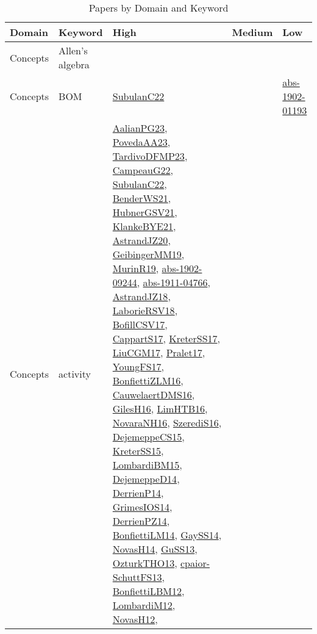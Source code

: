 {\scriptsize
\begin{longtable}{lp{3cm}>{\raggedright}p{6cm}>{\raggedright}p{6cm}p{8cm}}
\caption{Papers by Domain and Keyword}\\ \toprule
Domain & Keyword & High & Medium & Low\\ \midrule\endhead
\bottomrule
\endfoot
Concepts & Allen's algebra &  &  & \\
Concepts & BOM & \href{articles/SubulanC22.pdf}{SubulanC22}\cite{SubulanC22} &  & \href{articles/abs-1902-01193.pdf}{abs-1902-01193}\cite{abs-1902-01193}\\
Concepts & activity & \href{papers/AalianPG23.pdf}{AalianPG23}\cite{AalianPG23}, \href{papers/PovedaAA23.pdf}{PovedaAA23}\cite{PovedaAA23}, \href{papers/TardivoDFMP23.pdf}{TardivoDFMP23}\cite{TardivoDFMP23}, \href{articles/CampeauG22.pdf}{CampeauG22}\cite{CampeauG22}, \href{articles/SubulanC22.pdf}{SubulanC22}\cite{SubulanC22}, \href{papers/BenderWS21.pdf}{BenderWS21}\cite{BenderWS21}, \href{articles/HubnerGSV21.pdf}{HubnerGSV21}\cite{HubnerGSV21}, \href{papers/KlankeBYE21.pdf}{KlankeBYE21}\cite{KlankeBYE21}, \href{articles/AstrandJZ20.pdf}{AstrandJZ20}\cite{AstrandJZ20}, \href{papers/GeibingerMM19.pdf}{GeibingerMM19}\cite{GeibingerMM19}, \href{papers/MurinR19.pdf}{MurinR19}\cite{MurinR19}, \href{articles/abs-1902-09244.pdf}{abs-1902-09244}\cite{abs-1902-09244}, \href{articles/abs-1911-04766.pdf}{abs-1911-04766}\cite{abs-1911-04766}, \href{papers/AstrandJZ18.pdf}{AstrandJZ18}\cite{AstrandJZ18}, \href{articles/LaborieRSV18.pdf}{LaborieRSV18}\cite{LaborieRSV18}, \href{papers/BofillCSV17.pdf}{BofillCSV17}\cite{BofillCSV17}, \href{papers/CappartS17.pdf}{CappartS17}\cite{CappartS17}, \href{articles/KreterSS17.pdf}{KreterSS17}\cite{KreterSS17}, \href{papers/LiuCGM17.pdf}{LiuCGM17}\cite{LiuCGM17}, \href{papers/Pralet17.pdf}{Pralet17}\cite{Pralet17}, \href{papers/YoungFS17.pdf}{YoungFS17}\cite{YoungFS17}, \href{papers/BonfiettiZLM16.pdf}{BonfiettiZLM16}\cite{BonfiettiZLM16}, \href{papers/CauwelaertDMS16.pdf}{CauwelaertDMS16}\cite{CauwelaertDMS16}, \href{papers/GilesH16.pdf}{GilesH16}\cite{GilesH16}, \href{papers/LimHTB16.pdf}{LimHTB16}\cite{LimHTB16}, \href{articles/NovaraNH16.pdf}{NovaraNH16}\cite{NovaraNH16}, \href{papers/SzerediS16.pdf}{SzerediS16}\cite{SzerediS16}, \href{papers/DejemeppeCS15.pdf}{DejemeppeCS15}\cite{DejemeppeCS15}, \href{papers/KreterSS15.pdf}{KreterSS15}\cite{KreterSS15}, \href{papers/LombardiBM15.pdf}{LombardiBM15}\cite{LombardiBM15}, \href{papers/DejemeppeD14.pdf}{DejemeppeD14}\cite{DejemeppeD14}, \href{papers/DerrienP14.pdf}{DerrienP14}\cite{DerrienP14}, \href{articles/GrimesIOS14.pdf}{GrimesIOS14}\cite{GrimesIOS14}, \href{papers/DerrienPZ14.pdf}{DerrienPZ14}\cite{DerrienPZ14}, \href{papers/BonfiettiLM14.pdf}{BonfiettiLM14}\cite{BonfiettiLM14}, \href{papers/GaySS14.pdf}{GaySS14}\cite{GaySS14}, \href{articles/NovasH14.pdf}{NovasH14}\cite{NovasH14}, \href{papers/GuSS13.pdf}{GuSS13}\cite{GuSS13}, \href{articles/OzturkTHO13.pdf}{OzturkTHO13}\cite{OzturkTHO13}, \href{papers/cpaior-SchuttFS13.pdf}{cpaior-SchuttFS13}\cite{cpaior-SchuttFS13}, \href{papers/BonfiettiLBM12.pdf}{BonfiettiLBM12}\cite{BonfiettiLBM12}, \href{articles/LombardiM12.pdf}{LombardiM12}\cite{LombardiM12}, \href{articles/NovasH12.pdf}{NovasH12}\cite{NovasH12}, 
\end{longtable}}
